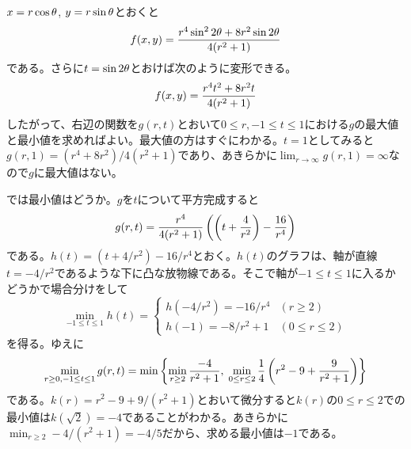 \begin{sol}
  $x = r \cos {\theta}$, $y = r \sin {\theta}$とおくと
  \[
  f(x,y) = \frac{r^4 \sin^2 2{\theta}  + 8 r^2 \sin 2{\theta} }{4(r^2 +1)}
  \]
  である。さらに$t = \sin 2 {\theta}$とおけば次のように変形できる。
  \[
  f(x,y) = \frac{ r^4 t^2 + 8 r^2 t}{4(r^2 + 1)}
  \]
  したがって、右辺の関数を$g(r,t)$とおいて$0 \leq r, -1 \leq t \leq 1$における$g$の最大値と最小値を求めればよい。最大値の方はすぐにわかる。$t=1$としてみると$g(r,1)=(r^4 + 8r^2)/4(r^2 +1)$であり、あきらかに$\lim_{r \to \infty} g(r,1)=\infty$なので$g$に最大値はない。

  では最小値はどうか。$g$を$t$について平方完成すると
  \[
  g(r,t) = \frac{r^4 }{4(r^2 + 1)} \left( \left(t+ \frac{4}{r^2} \right) - \frac{16}{r^4} \right)
  \]
  である。$h(t)= (t+ 4/r^2) - 16/r^4$とおく。$h(t)$のグラフは、軸が直線$t = -4 / r^2$であるような下に凸な放物線である。そこで軸が$-1 \leq t \leq 1$に入るかどうかで場合分けをして
  \[
  \min_{-1 \leq t \leq 1} h(t) = \begin{cases}
  h(-4/r^2) = -16/r^4 &(r \geq 2) \\
  h(-1)= - 8/r^2 + 1 &(0 \leq r \leq 2)
\end{cases}
  \]
  を得る。ゆえに
  \[
  \min_{r \geq 0, -1 \leq t \leq 1} g(r,t) = \min \left\{ \min_{r \geq 2} \frac{-4}{r^2 +1} ,\; \min_{0 \leq r \leq 2} \frac{1}{4} \left( r^2 - 9 + \frac{9}{r^2+1} \right) \right\}
  \]
  である。$k(r) =  r^2 - 9 + 9/(r^2+1)$とおいて微分すると$k(r)$の$0 \leq r \leq 2$での最小値は$k(\sqrt{2}) = -4$であることがわかる。あきらかに$\min_{r \geq 2} -4/(r^2 +1) = -4/5$だから、求める最小値は$-1$である。
\end{sol}
